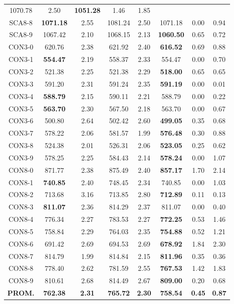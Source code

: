 \begin{table}[h]
\begin{tabular}{c c c c c c c c}
1070.78 & 2.50 & \bf{1051.28} & 
1.46 & 1.85\\SCA8-8 & \bf{1071.18} & 2.55 & 
1081.24 & 2.50 & 1071.18 & 0.00
 & 0.94\\SCA8-9 & 1067.42 & 2.10 & 
1068.15 & 2.13 & \bf{1060.50} & 
0.65 & 0.72\\CON3-0 & 620.76 & 2.38 & 
621.92 & 2.40 & \bf{616.52} & 
0.69 & 0.88\\CON3-1 & \bf{554.47} & 2.19 & 
558.37 & 2.33 & 554.47 & 0.00
 & 0.70\\CON3-2 & 521.38 & 2.25 & 
521.38 & 2.29 & \bf{518.00} & 
0.65 & 0.65\\CON3-3 & 591.20 & 2.31 & 
591.24 & 2.35 & \bf{591.19} & 
0.00 & 0.01\\CON3-4 & \bf{588.79} & 2.15 & 
590.11 & 2.21 & 588.79 & 0.00
 & 0.22\\CON3-5 & \bf{563.70} & 2.30 & 
567.50 & 2.18 & 563.70 & 0.00
 & 0.67\\CON3-6 & 500.80 & 2.64 & 
502.42 & 2.60 & \bf{499.05} & 
0.35 & 0.68\\CON3-7 & 578.22 & 2.06 & 
581.57 & 1.99 & \bf{576.48} & 
0.30 & 0.88\\CON3-8 & 524.38 & 2.01 & 
526.31 & 2.06 & \bf{523.05} & 
0.25 & 0.62\\CON3-9 & 578.25 & 2.25 & 
584.43 & 2.14 & \bf{578.24} & 
0.00 & 1.07\\CON8-0 & 871.77 & 2.38 & 
875.49 & 2.40 & \bf{857.17} & 
1.70 & 2.14\\CON8-1 & \bf{740.85} & 2.40 & 
748.45 & 2.34 & 740.85 & 0.00
 & 1.03\\CON8-2 & 713.68 & 3.16 & 
713.85 & 2.80 & \bf{712.89} & 
0.11 & 0.13\\CON8-3 & \bf{811.07} & 2.36 & 
814.29 & 2.37 & 811.07 & 0.00
 & 0.40\\CON8-4 & 776.34 & 2.27 & 
783.53 & 2.27 & \bf{772.25} & 
0.53 & 1.46\\CON8-5 & 758.84 & 2.29 & 
764.03 & 2.35 & \bf{754.88} & 
0.52 & 1.21\\CON8-6 & 691.42 & 2.69 & 
694.53 & 2.69 & \bf{678.92} & 
1.84 & 2.30\\CON8-7 & 814.79 & 1.99 & 
814.84 & 2.15 & \bf{811.96} & 
0.35 & 0.36\\CON8-8 & 778.40 & 2.62 & 
781.59 & 2.55 & \bf{767.53} & 
1.42 & 1.83\\CON8-9 & 810.61 & 2.68 & 
814.49 & 2.67 & \bf{809.00} & 
0.20 & 0.68\\\bf{PROM.} & 
\bf{762.38} & \bf{2.31} & \bf{765.72} & \bf{2.30} & \bf{758.54} & \bf{0.45} & \bf{0.87}\\[1ex]\hline
\end{tabular}
\label{table:AS-M-dethloff}
\end{table}
